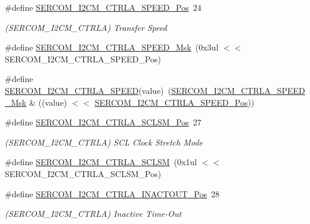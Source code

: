 \begin{DoxyCompactItemize}
\#define \mbox{\hyperlink{group___s_a_m_d21___s_e_r_c_o_m_ga1918dcf793b5c5e5771c8170cb5d0011}{S\+E\+R\+C\+O\+M\+\_\+\+I2\+C\+M\+\_\+\+C\+T\+R\+L\+A\+\_\+\+S\+P\+E\+E\+D\+\_\+\+Pos}}~24
\begin{DoxyCompactList}\small\item\em (S\+E\+R\+C\+O\+M\+\_\+\+I2\+C\+M\+\_\+\+C\+T\+R\+LA) Transfer Speed \end{DoxyCompactList}\item 
\#define \mbox{\hyperlink{group___s_a_m_d21___s_e_r_c_o_m_ga9e2f87a54eb9a5bf8fe4df55f362ff89}{S\+E\+R\+C\+O\+M\+\_\+\+I2\+C\+M\+\_\+\+C\+T\+R\+L\+A\+\_\+\+S\+P\+E\+E\+D\+\_\+\+Msk}}~(0x3ul $<$$<$ S\+E\+R\+C\+O\+M\+\_\+\+I2\+C\+M\+\_\+\+C\+T\+R\+L\+A\+\_\+\+S\+P\+E\+E\+D\+\_\+\+Pos)
\item 
\#define \mbox{\hyperlink{group___s_a_m_d21___s_e_r_c_o_m_ga67406e698c6246c4ab6c4f915be721e8}{S\+E\+R\+C\+O\+M\+\_\+\+I2\+C\+M\+\_\+\+C\+T\+R\+L\+A\+\_\+\+S\+P\+E\+ED}}(value)~(\mbox{\hyperlink{group___s_a_m_d21___s_e_r_c_o_m_ga9e2f87a54eb9a5bf8fe4df55f362ff89}{S\+E\+R\+C\+O\+M\+\_\+\+I2\+C\+M\+\_\+\+C\+T\+R\+L\+A\+\_\+\+S\+P\+E\+E\+D\+\_\+\+Msk}} \& ((value) $<$$<$ \mbox{\hyperlink{group___s_a_m_d21___s_e_r_c_o_m_ga1918dcf793b5c5e5771c8170cb5d0011}{S\+E\+R\+C\+O\+M\+\_\+\+I2\+C\+M\+\_\+\+C\+T\+R\+L\+A\+\_\+\+S\+P\+E\+E\+D\+\_\+\+Pos}}))
\item 
\#define \mbox{\hyperlink{group___s_a_m_d21___s_e_r_c_o_m_ga3267a4fcea3a01b8d36306f3eda2d2f7}{S\+E\+R\+C\+O\+M\+\_\+\+I2\+C\+M\+\_\+\+C\+T\+R\+L\+A\+\_\+\+S\+C\+L\+S\+M\+\_\+\+Pos}}~27
\begin{DoxyCompactList}\small\item\em (S\+E\+R\+C\+O\+M\+\_\+\+I2\+C\+M\+\_\+\+C\+T\+R\+LA) S\+CL Clock Stretch Mode \end{DoxyCompactList}\item 
\#define \mbox{\hyperlink{group___s_a_m_d21___s_e_r_c_o_m_gad0f1373a6e845e01fb7ae12fd9d8a8bb}{S\+E\+R\+C\+O\+M\+\_\+\+I2\+C\+M\+\_\+\+C\+T\+R\+L\+A\+\_\+\+S\+C\+L\+SM}}~(0x1ul $<$$<$ S\+E\+R\+C\+O\+M\+\_\+\+I2\+C\+M\+\_\+\+C\+T\+R\+L\+A\+\_\+\+S\+C\+L\+S\+M\+\_\+\+Pos)
\item 
\#define \mbox{\hyperlink{group___s_a_m_d21___s_e_r_c_o_m_gab108df919979b2311d7317ae9fbfb5a3}{S\+E\+R\+C\+O\+M\+\_\+\+I2\+C\+M\+\_\+\+C\+T\+R\+L\+A\+\_\+\+I\+N\+A\+C\+T\+O\+U\+T\+\_\+\+Pos}}~28
\begin{DoxyCompactList}\small\item\em (S\+E\+R\+C\+O\+M\+\_\+\+I2\+C\+M\+\_\+\+C\+T\+R\+LA) Inactive Time-\/\+Out \end{DoxyCompactList}\item 
$$
\end{DoxyCompactItemize}
